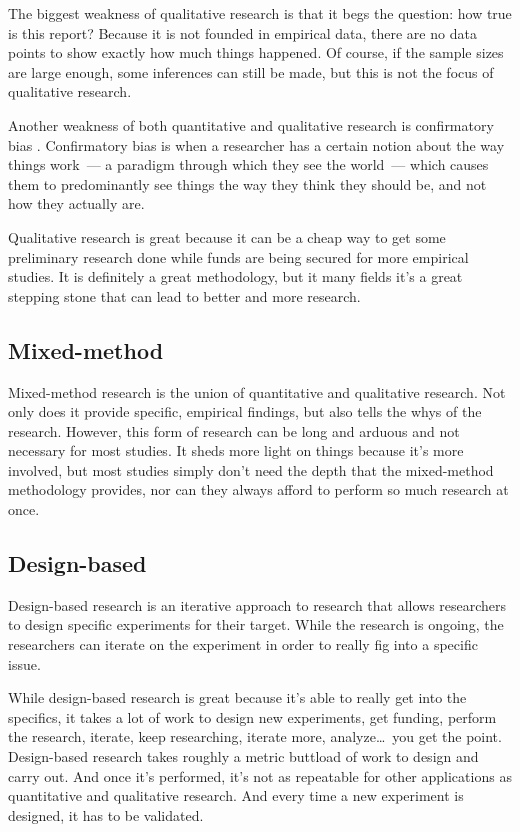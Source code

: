 \documentclass[man,natbib]{apa6}
\begin{document}
The biggest weakness of qualitative research is that it begs the question: how true is this report? Because it is not founded in empirical data, there are no data points to show exactly how much things happened. Of course, if the sample sizes are large enough, some inferences can still be made, but this is not the focus of qualitative research.

Another weakness of both quantitative and qualitative research is confirmatory bias \citep{furlong2000research}. Confirmatory bias is when a researcher has a certain notion about the way things work~--- a paradigm through which they see the world~--- which causes them to predominantly see things the way they think they should be, and not how they actually are.

Qualitative research is great because it can be a cheap way to get some preliminary research done while funds are being secured for more empirical studies. It is definitely a great methodology, but it many fields it's a great stepping stone that can lead to better and more research.

\subsection{Mixed-method}
Mixed-method research is the union of quantitative and qualitative research. Not only does it provide specific, empirical findings, but also tells the whys of the research. However, this form of research can be long and arduous and not necessary for most studies. It sheds more light on things because it's more involved, but most studies simply don't need the depth that the mixed-method methodology provides, nor can they always afford to perform so much research at once.

\subsection{Design-based}
Design-based research is an iterative approach to research that allows researchers to design specific experiments for their target. While the research is ongoing, the researchers can iterate on the experiment in order to really fig into a specific issue.

While design-based research is great because it's able to really get into the specifics, it takes a lot of work to design new experiments, get funding, perform the research, iterate, keep researching, iterate more, analyze\dots\ you get the point. Design-based research takes roughly a metric buttload of work to design and carry out. And once it's performed, it's not as repeatable for other applications as quantitative and qualitative research. And every time a new experiment is designed, it has to be validated.
\end{document}
